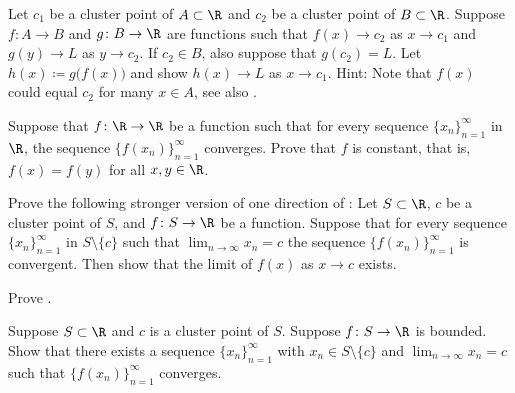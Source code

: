 \begin{exercise} \label{exercise:contlimitcomposition}
Let $c_1$ be a cluster point of $A \subset \R$ and $c_2$ be
a cluster point of $B \subset \R$.  Suppose 
$f \colon A \to B$ and $g \colon B \to \R$ are functions
such that
$f(x) \to c_2$ as $x \to c_1$ and
$g(y) \to L$ as $y \to c_2$.  If $c_2 \in B$, also suppose that $g(c_2) = L$.
Let $h(x) \coloneqq g\bigl(f(x)\bigr)$ and show
$h(x) \to L$ as $x \to c_1$.
Hint: Note that $f(x)$ could equal $c_2$ for many $x \in A$,
see also
.
\end{exercise}

\begin{exercise}
Suppose that $f \colon \R \to \R$ be a function such that for every 
sequence $\{x_n\}_{n=1}^\infty$ in $\R$, the sequence
$\bigl\{ f(x_n) \bigr\}_{n=1}^\infty$ converges.  Prove that
$f$ is constant, that is,
$f(x) = f(y)$ for all $x,y \in \R$.
\end{exercise}

\begin{exercise} \label{exercise:seqflimitalt}
Prove the following stronger version of one direction of
:
Let $S \subset \R$, $c$ be a cluster point of $S$, and $f \colon S \to
\R$ be a function.
Suppose that for every sequence $\{x_n\}_{n=1}^\infty$ in $S \setminus \{c\}$ such that
$\lim_{n\to\infty} x_n = c$ the sequence $\bigl\{ f(x_n) \bigr\}_{n=1}^\infty$ is convergent.
Then show that the limit of $f(x)$ as $x \to c$ exists.
\end{exercise}

\begin{exercise}
Prove .
\end{exercise}

\begin{exercise}
Suppose $S \subset \R$ and $c$ is a cluster point of $S$.  Suppose $f \colon
S \to \R$ is bounded.  Show that there exists a sequence
$\{ x_n \}_{n=1}^\infty$
with $x_n \in S \setminus \{ c \}$ and $\lim_{n\to\infty} x_n = c$ such that
$\bigl\{ f(x_n) \bigr\}_{n=1}^\infty$ converges.
\end{exercise}

